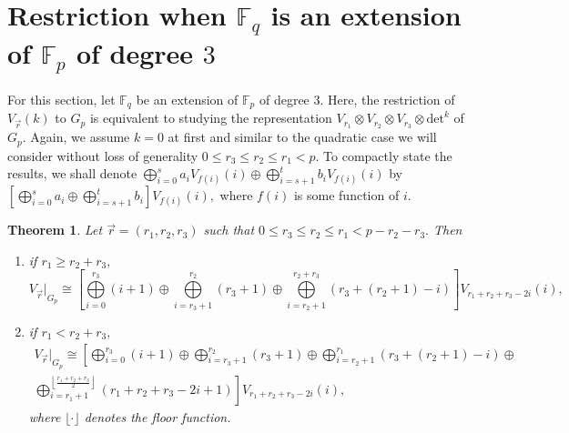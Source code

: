 \documentclass[10pt, reqno]{amsart}
\def\F{{\mathbb F}}
\def\Gp{{G_p}}
\numberwithin{equation}{section}
\newtheorem{theorem}{Theorem}[section] %
\theoremstyle{remark}
\begin{document}
\section{Restriction when $\F_q$ is an extension of $\F_p$ of degree $3$}\label{S4}
	For this section, let $\F_q$ be an extension of $\F_p$ of degree $3.$ Here, the restriction of $V_{\vec{r}}(k)$ to $\Gp$  is equivalent to studying the representation $V_{r_1}\otimes V_{r_2}\otimes V_{r_3}\otimes\mathrm{det}^k$ of $\Gp.$ Again, we assume $k=0$ at first and similar to the quadratic case we will consider without loss of generality $0\leq r_3\leq r_2\leq r_1<p.$	To compactly state the results, we shall denote $\displaystyle{\bigoplus\limits_{i=0}^{s}a_iV_{f(i)}(i)\oplus\bigoplus\limits_{i=s+1}^{t}b_i}V_{f(i)}(i)$ by $\displaystyle{\left[\bigoplus\limits_{i=0}^{s}a_i\oplus\bigoplus\limits_{i=s+1}^{t}b_i\right]}V_{f(i)}(i),$ where $f(i)$ is some function of $i.$
	
	\begin{theorem}\label{T3}
		Let $\vec{r}=(r_1,r_2,r_3)$ such that $ 0\leq r_3\leq r_2\leq r_1< p-r_2-r_3.$ Then
		\begin{enumerate}
			\item if $r_1\geq r_2+r_3,$
			\begin{equation*}
			    {V_{\vec{r}}|}_{\Gp}\cong            	\displaystyle{\left[\bigoplus\limits_{i=0}^{r_3}(i+1)\oplus\bigoplus\limits_{i=r_3+1}^{r_2}(r_3+1)\oplus \bigoplus\limits_{i=r_2+1}^{r_2+r_3}(r_3+(r_2+1)-i)\right]V_{r_1+r_2+r_3-2i}(i),}
			\end{equation*}				
			
			\item if $r_1< r_2+r_3,$
			\begin{multline*}
			    {V_{\vec{r}}|}_{\Gp}\cong 
				\left[\displaystyle{\bigoplus\limits_{i=0}^{r_3}(i+1)\oplus\bigoplus\limits_{i=r_3+1}^{r_2}(r_3+1)\oplus\bigoplus\limits_{i=r_2+1}^{r_1}(r_3+(r_2+1)-i)\oplus}\right.\\
\left.\displaystyle{\bigoplus\limits_{i=r_1+1}^{\left\lfloor\frac{r_1+r_2+r_3}{2}\right\rfloor}(r_1+r_2+r_3-2i+1)}\right] V_{r_1+r_2+r_3-2i}(i),
			\end{multline*}
where $\lfloor \cdot\rfloor$ denotes the floor function.
			
		\end{enumerate}
	\end{theorem}
	
\end{document}
